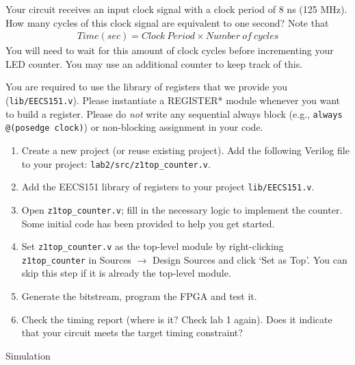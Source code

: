 \documentclass[11pt]{article}
\makeatletter
\renewcommand{\section}
{\@startsection {section}{1}{0pt}
 {-2ex}
 {1ex}
 {\bfseries\Large}}
\makeatother
\begin{document}
Your circuit receives an input clock signal with a clock period of 8 ns (125 MHz). How many cycles of this clock signal are equivalent to one second? Note that
\begin{align*}
Time (sec) = Clock\ Period \times Number\ of\ cycles
\end{align*}
You will need to wait for this amount of clock cycles before incrementing your LED counter. You may use an additional counter to keep track of this.

You are required to use the library of registers that we provide you (\verb|lib/EECS151.v|). Please instantiate a REGISTER* module whenever you want to build a register. Please do \emph{not} write any sequential always block (e.g., \texttt{always @(posedge clock)}) or non-blocking assignment in your code.

\begin{enumerate}
  \item Create a new project (or reuse existing project). Add the following Verilog file to your project: \verb|lab2/src/z1top_counter.v|.
  \item Add the EECS151 library of registers to your project \verb|lib/EECS151.v|.
  \item Open \verb|z1top_counter.v|; fill in the necessary logic to implement the counter. Some initial code has been provided to help you get started.
  \item Set \verb|z1top_counter.v| as the top-level module by right-clicking \texttt{z1top\_counter} in Sources $\rightarrow$ Design Sources and click `Set as Top'. You can skip this step if it is already the top-level module.
  \item Generate the bitstream, program the FPGA and test it.
  \item Check the timing report (where is it? Check lab 1 again). Does it indicate that your circuit meets the target timing constraint?
\end{enumerate}

\section{Simulation}
\end{document}
